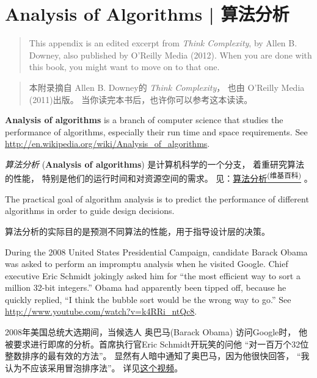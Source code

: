 \chapter{Analysis of Algorithms  |  算法分析}
\label{algorithms}

\begin{quote}
This appendix is an edited excerpt from {\it Think Complexity}, by
Allen B. Downey, also published by O'Reilly Media (2012).  When you
are done with this book, you might want to move on to that one.
\end{quote}

\begin{quote}
本附录摘自 Allen B. Downey的 {\em Think Complexity}， 也由 O’Reilly Media (2011)出版。 当你读完本书后，也许你可以参考这本读读。
\end{quote}

{\bf Analysis of algorithms} is a branch of computer science that
studies the performance of algorithms, especially their run time and
space requirements.  See
\url{http://en.wikipedia.org/wiki/Analysis_of_algorithms}.

{\em 算法分析} ({\bf Analysis of algorithms}) 是计算机科学的一个分支，
 着重研究算法的性能， 特别是他们的运行时间和对资源空间的需求。
见：\href{http://en.wikipedia.org/wiki/Analysis_of_algorithms}{算法分析\textsuperscript{(维基百科)}} 。
 

The practical goal of algorithm analysis is to predict the performance
of different algorithms in order to guide design decisions.

算法分析的实际目的是预测不同算法的性能，用于指导设计层的决策。

During the 2008 United States Presidential Campaign, candidate
Barack Obama was asked to perform an impromptu analysis when
he visited Google.  Chief executive Eric Schmidt jokingly asked him
for ``the most efficient way to sort a million 32-bit integers.''
Obama had apparently been tipped off, because he quickly
replied, ``I think the bubble sort would be the wrong way to go.''
See \url{http://www.youtube.com/watch?v=k4RRi_ntQc8}.

2008年美国总统大选期间，当候选人 奥巴马(Barack Obama) 访问Google时，
他被要求进行即席的分析。首席执行官Eric Schmidt开玩笑的问他
``对一百万个32位整数排序的最有效的方法''。
显然有人暗中通知了奥巴马，因为他很快回答， ``我认为不应该采用冒泡排序法''。
详见\href{http://www.youtube.com/watch?v=k4RRi_ntQc8}{这个视频}。
    


